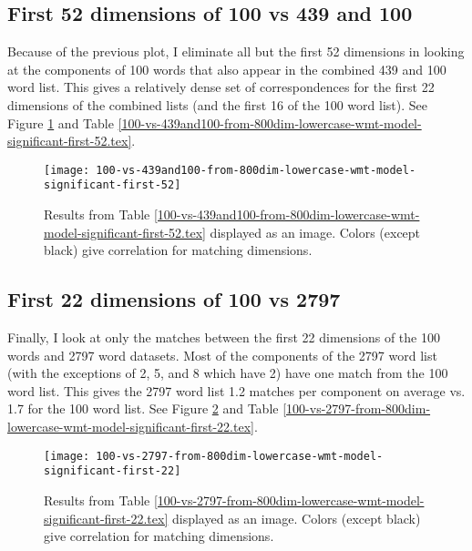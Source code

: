 \documentclass[eric_thesis.tex]{subfiles}
\begin{document}
\subsection{First 52 dimensions of 100 vs 439 and 100}

Because of the previous plot, I eliminate all but the first 52 dimensions in
looking at the components of 100 words that also appear in the combined 439
and 100 word list. This gives a relatively dense set of correspondences for the
first 22 dimensions of the combined lists (and the first 16 of the 100 word
list). See Figure \ref{fig:100vs439And100First52} and Table 
\ref{100-vs-439and100-from-800dim-lowercase-wmt-model-significant-first-52.tex}.



\begin{figure}[tbp]
    \texttt{[image: 100-vs-439and100-from-800dim-lowercase-wmt-model-significant-first-52]}
    \caption{Results from Table 
    \ref{100-vs-439and100-from-800dim-lowercase-wmt-model-significant-first-52.tex} 
    displayed as an image. Colors (except black) give correlation for matching 
    dimensions.}
    \label{fig:100vs439And100First52}
\end{figure}

\subsection{First 22 dimensions of 100 vs 2797}

Finally, I look at only the matches between the first 22 dimensions of the
100 words and 2797 word datasets. Most of the components of the 2797 word list 
(with the exceptions of 2, 5, and 8 which have 2) have one match from the 100 
word list. This gives the 2797 word list 1.2 matches per component on average
vs. 1.7 for the 100 word list.
See Figure \ref{fig:100vs2797First22} and
Table 
\ref{100-vs-2797-from-800dim-lowercase-wmt-model-significant-first-22.tex}.




\begin{figure}[tbp]
    \texttt{[image: 100-vs-2797-from-800dim-lowercase-wmt-model-significant-first-22]}
    \caption{Results from Table 
    \ref{100-vs-2797-from-800dim-lowercase-wmt-model-significant-first-22.tex} 
    displayed as an image. Colors (except black) give correlation for matching 
    dimensions.}
    \label{fig:100vs2797First22}
\end{figure}
\end{document}
